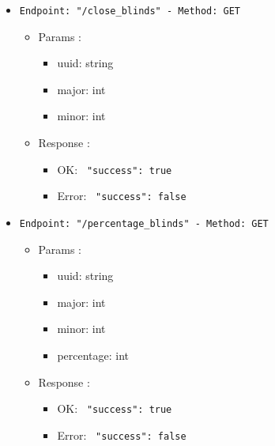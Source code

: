 \begin{itemize}
  \item \texttt{Endpoint: "/close_blinds" -  Method: GET}
  \begin{itemize} 
    \item Params :
    \begin{itemize}
      \item uuid: string
      \item major: int
      \item minor: int
    \end{itemize}

    \item Response : 
    \begin{itemize}
      \item OK: \texttt{{ "success": true }}
      \item Error: \texttt{{ "success": false }}
    \end{itemize}
  \end{itemize}
\end{itemize}

\begin{itemize}
  \item \texttt{Endpoint: "/percentage_blinds" -  Method: GET}
  \begin{itemize} 
    \item Params :
    \begin{itemize}
      \item uuid: string
      \item major: int
      \item minor: int
      \item percentage: int
    \end{itemize}

    \item Response : 
    \begin{itemize}
      \item OK: \texttt{{ "success": true }}
      \item Error: \texttt{{ "success": false }}
    \end{itemize}
  \end{itemize}
\end{itemize}

